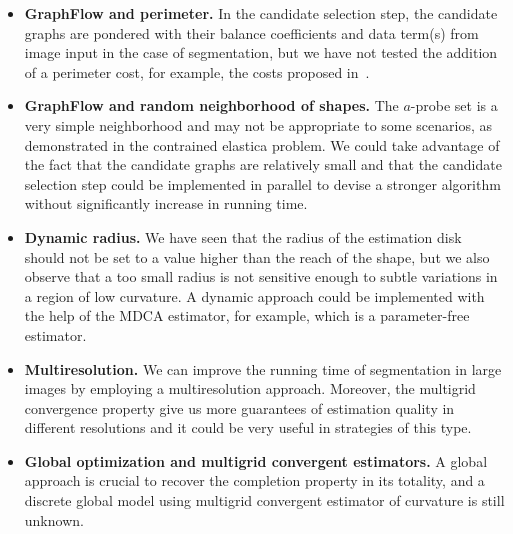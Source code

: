 \begin{itemize}
	\item[]{\textbf{GraphFlow and perimeter.} In the candidate selection step, the candidate graphs are pondered with their balance coefficients and data term(s) from image input in the case of segmentation, but we have not tested the addition of a perimeter cost, for example, the costs proposed in~\cite{boykov03geodesics}}. 
	\item[]{\textbf{GraphFlow and random neighborhood of shapes.} The $a$-probe set is a very simple neighborhood and may not be appropriate to some scenarios, as demonstrated in the contrained elastica problem. We could take advantage of the fact that the candidate graphs are relatively small and that the candidate selection step could be implemented in parallel to devise a stronger algorithm without significantly increase in running time.} 
	\item[]{\textbf{Dynamic radius.} We have seen that the radius of the estimation disk should not be set to a value higher than the reach of the shape, but we also observe that a too small radius is not sensitive enough to subtle variations in a region of low curvature. A dynamic approach could be implemented with the help of the MDCA estimator, for example, which is a parameter-free estimator. }
	\item[]{\textbf{Multiresolution.} We can improve the running time of segmentation in large images by employing a multiresolution approach. Moreover, the multigrid convergence property give us more guarantees of estimation quality in different resolutions and it could be very useful in strategies of this type.}
	\item[]{\textbf{Global optimization and multigrid convergent estimators.} A global approach is crucial to recover the completion property in its totality, and a discrete global model using multigrid convergent estimator of curvature is still unknown.}
\end{itemize}
 




